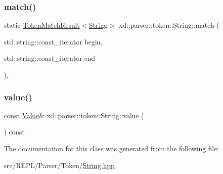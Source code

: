\subsubsection{\texorpdfstring{match()}{match()}}
{\footnotesize\ttfamily static \mbox{\hyperlink{namespacexd_1_1parser_1_1token_a766c52bbfb7cb1f08498ef0bb9ec756e}{Token\+Match\+Result}}$<$\mbox{\hyperlink{classxd_1_1parser_1_1token_1_1_string}{String}}$>$ xd\+::parser\+::token\+::\+String\+::match (\begin{DoxyParamCaption}\item[{std\+::string\+::const\+\_\+iterator}]{begin,  }\item[{std\+::string\+::const\+\_\+iterator}]{end }\end{DoxyParamCaption})\hspace{0.3cm}{\ttfamily [inline]}, {\ttfamily [static]}}

\mbox{\label{classxd_1_1parser_1_1token_1_1_string_ad376517a8ef62e7bc5fb04b67eb890cc}} 
\subsubsection{\texorpdfstring{value()}{value()}}
{\footnotesize\ttfamily const \mbox{\hyperlink{classxd_1_1parser_1_1token_1_1_string_a32f8a1104e17222ee386be2b7a621e3a}{Value}}\& xd\+::parser\+::token\+::\+String\+::value (\begin{DoxyParamCaption}{ }\end{DoxyParamCaption}) const\hspace{0.3cm}{\ttfamily [inline]}}



The documentation for this class was generated from the following file\+:\begin{DoxyCompactItemize}
\item 
src/\+R\+E\+P\+L/\+Parser/\+Token/\mbox{\hyperlink{_r_e_p_l_2_parser_2_token_2_string_8hpp}{String.\+hpp}}\end{DoxyCompactItemize}
